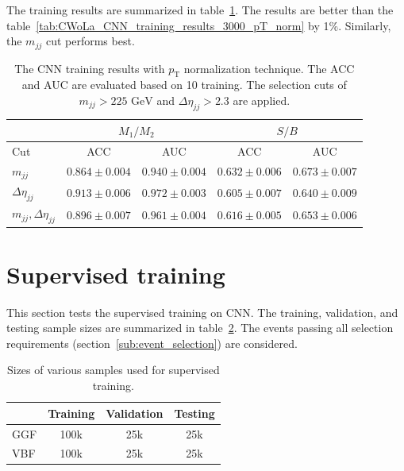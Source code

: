 \documentclass[12pt]{article}
\begin{document}
    The training results are summarized in table~\ref{tab:CWoLa_CNN_training_results_3000_pT_norm_225_2.3}. The results are better than the table~\ref{tab:CWoLa_CNN_training_results_3000_pT_norm} by 1\%. Similarly, the $m_{jj}$ cut performs best. 
    \begin{table}[htpb]
        \centering
        \caption{The CNN training results with $p_{\text{T}}$ normalization technique. The ACC and AUC are evaluated based on 10 training. The selection cuts of $m_{jj} > \text{225 GeV}$ and $\Delta\eta_{jj} > 2.3$ are applied.}
        \label{tab:CWoLa_CNN_training_results_3000_pT_norm_225_2.3}
        \begin{tabular}{l|cc|cc}
                                      & \multicolumn{2}{c|}{$M_1 / M_2$}      & \multicolumn{2}{c}{$S / B$}           \\ \hline
            Cut                       & ACC               & AUC               & ACC               & AUC               \\ \hline
            $m_{jj}$                  & $0.864 \pm 0.004$ & $0.940 \pm 0.004$ & $0.632 \pm 0.006$ & $0.673 \pm 0.007$ \\
            $\Delta\eta_{jj}$         & $0.913 \pm 0.006$ & $0.972 \pm 0.003$ & $0.605 \pm 0.007$ & $0.640 \pm 0.009$ \\
            $m_{jj}, \Delta\eta_{jj}$ & $0.896 \pm 0.007$ & $0.961 \pm 0.004$ & $0.616 \pm 0.005$ & $0.653 \pm 0.006$
        \end{tabular}
    \end{table}
\section{Supervised training}%
\label{sec:supervised_training}
    This section tests the supervised training on CNN. The training, validation, and testing sample sizes are summarized in table~\ref{tab:supervised_sample_size}. The events passing all selection requirements (section~\ref{sub:event_selection}) are considered.
    \begin{table}[htbp]
        \centering
        \caption{Sizes of various samples used for supervised training.}
        \label{tab:supervised_sample_size}
        \begin{tabular}{l|ccc}
                & Training & Validation & Testing \\ \hline
            GGF & 100k     & 25k        & 25k     \\
            VBF & 100k     & 25k        & 25k      
        \end{tabular}
    \end{table}
\end{document}
